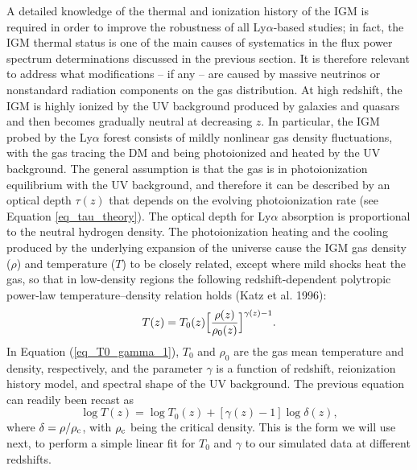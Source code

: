 \documentclass{emulateapj}
\begin{document}
A detailed knowledge of the thermal and ionization history of
the IGM is required in order to 
improve the robustness of all Ly$\alpha$-based studies; in fact, 
the IGM thermal   status  is one of the main causes of 
systematics in the flux power spectrum determinations discussed in the previous section. 
It is therefore relevant to address what modifications -- if any -- are caused by massive neutrinos or nonstandard
radiation components on the gas distribution. 
At high redshift, the IGM is highly ionized by the UV 
background produced by galaxies and quasars and then becomes gradually neutral at decreasing $z$.
In particular, the IGM probed by the Ly$\alpha$ forest consists of mildly nonlinear gas density fluctuations, with
the gas tracing the DM and being photoionized   and heated by the UV background. 
The general assumption is that the
gas is   in photoionization equilibrium with the UV background, and therefore it can be described by an optical depth $\tau (z)$
that depends on the evolving photoionization rate (see Equation \ref{eq_tau_theory}). The
optical depth for Ly$\alpha$ absorption is proportional to the neutral hydrogen density. 
 The photoionization heating and the cooling produced by the underlying expansion of the universe 
 cause the IGM gas density ($\rho$)
and temperature ($T$) to be closely related, except where mild shocks heat the gas, so that in low-density regions the following redshift-dependent
polytropic power-law temperature--density 
relation holds (Katz et al. 1996):
\begin{equation}
T(z) = T_0(z) \Big [{\rho (z) \over \rho_0 (z) }\Big ]^{\gamma(z) -1}.
\label{eq_T0_gamma_1}
\end{equation}
In Equation (\ref{eq_T0_gamma_1}), $T_0$ and $\rho_0$ are the  gas mean temperature and density, respectively, and the
parameter $\gamma$ is a function of redshift, reionization history model, 
and spectral shape of the UV background.
The previous equation can readily been recast as
\begin{equation}
\log T(z) = \log T_0(z) + [\gamma(z) -1] \log \delta (z),
\label{eq_T0_gamma_2}
\end{equation} 
 where $\delta=\rho/\rho_{\rm c}$, with $\rho_{\rm c}$ being the critical density. 
This is the form we will use next,  to perform a simple linear fit  for $T_0$ and $\gamma$ to our simulated data
at different redshifts. 

\end{document}
